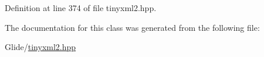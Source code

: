Definition at line 374 of file tinyxml2.\-hpp.



The documentation for this class was generated from the following file\-:\begin{DoxyCompactItemize}
\item 
Glide/\hyperlink{tinyxml2_8hpp}{tinyxml2.\-hpp}\end{DoxyCompactItemize}
